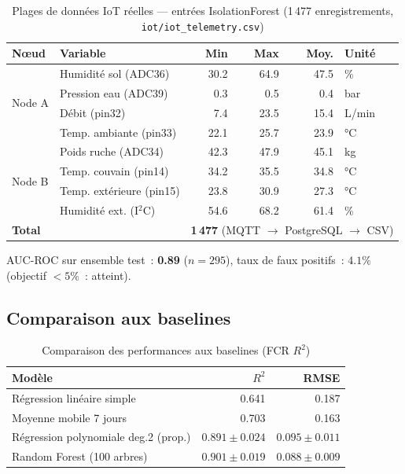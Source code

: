 \begin{table}[H]
\caption{Plages de données IoT réelles --- entrées IsolationForest
(1\,477 enregistrements, \texttt{iot/iot\_telemetry.csv})}
\label{tab:iot_ranges}
\centering
\begin{tabular}{@{}llrrrl@{}}
\toprule
\textbf{Nœud} & \textbf{Variable} & \textbf{Min} & \textbf{Max}
  & \textbf{Moy.} & \textbf{Unité} \\
\midrule
\multirow{4}{*}{Node A}
  & Humidité sol (ADC36)   & 30.2 & 64.9 & 47.5 & \% \\
  & Pression eau (ADC39)   &  0.3 &  0.5 &  0.4 & bar \\
  & Débit (pin32)          &  7.4 & 23.5 & 15.4 & L/min \\
  & Temp. ambiante (pin33) & 22.1 & 25.7 & 23.9 & °C \\
\midrule
\multirow{4}{*}{Node B}
  & Poids ruche (ADC34)      & 42.3 & 47.9 & 45.1 & kg \\
  & Temp. couvain (pin14)    & 34.2 & 35.5 & 34.8 & °C \\
  & Temp. extérieure (pin15) & 23.8 & 30.9 & 27.3 & °C \\
  & Humidité ext. (I$^2$C)   & 54.6 & 68.2 & 61.4 & \% \\
\midrule
\multicolumn{2}{l}{\textbf{Total}} & \multicolumn{4}{l}{\textbf{1\,477} (MQTT $\rightarrow$ PostgreSQL $\rightarrow$ CSV)} \\
\bottomrule
\end{tabular}
\end{table}

AUC-ROC sur ensemble test~: \textbf{0.89} ($n = 295$), taux de faux positifs~: $4.1\%$
(objectif $< 5\%$~: atteint).

\subsection{Comparaison aux baselines}

\begin{table}[H]
\centering
\caption{Comparaison des performances aux baselines (FCR $R^2$)}
\label{tab:baseline}
\begin{tabular}{lrr}
\toprule
\textbf{Modèle} & $R^2$ & \textbf{RMSE} \\
\midrule
Régression linéaire simple          & 0.641              & 0.187 \\
Moyenne mobile 7 jours              & 0.703              & 0.163 \\
Régression polynomiale deg.2 (prop.)& $0.891 \pm 0.024$  & $0.095 \pm 0.011$ \\
Random Forest (100 arbres)          & $0.901 \pm 0.019$  & $0.088 \pm 0.009$ \\
\bottomrule
\end{tabular}
\end{table}

